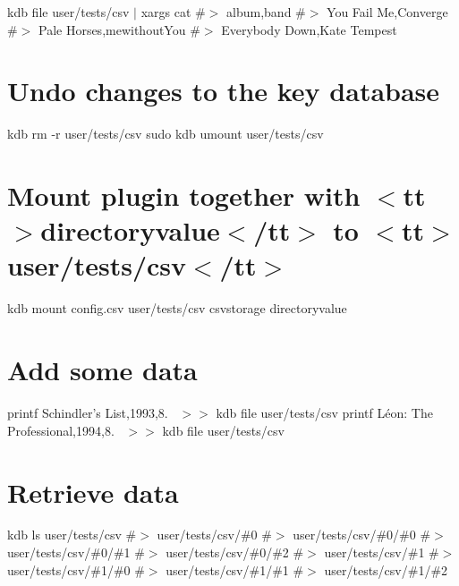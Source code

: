 kdb file user/tests/csv $\vert$ xargs cat \#$>$ album,band \#$>$ You Fail Me,Converge \#$>$ Pale Horses,mewithout\+You \#$>$ Everybody Down,Kate Tempest\hypertarget{autotoc_md126_autotoc_md141}{}\section{Undo changes to the key database}\label{autotoc_md126_autotoc_md141}
kdb rm -\/r user/tests/csv sudo kdb umount user/tests/csv 
\begin{DoxyCode}{0}
\DoxyCodeLine{}
\end{DoxyCode}
 \hypertarget{autotoc_md126_autotoc_md142}{}\section{Mount plugin together with $<$tt$>$directoryvalue$<$/tt$>$ to $<$tt$>$user/tests/csv$<$/tt$>$}\label{autotoc_md126_autotoc_md142}
kdb mount config.\+csv user/tests/csv csvstorage directoryvalue\hypertarget{autotoc_md126_autotoc_md143}{}\section{Add some data}\label{autotoc_md126_autotoc_md143}
printf \textquotesingle{}Schindler’s List,1993,8.~\newline
\textquotesingle{} $>$$>$ {\ttfamily kdb file user/tests/csv} printf \textquotesingle{}Léon\+: The Professional,1994,8.~\newline
\textquotesingle{} $>$$>$ {\ttfamily kdb file user/tests/csv}\hypertarget{autotoc_md126_autotoc_md144}{}\section{Retrieve data}\label{autotoc_md126_autotoc_md144}
kdb ls user/tests/csv \#$>$ user/tests/csv/\#0 \#$>$ user/tests/csv/\#0/\#0 \#$>$ user/tests/csv/\#0/\#1 \#$>$ user/tests/csv/\#0/\#2 \#$>$ user/tests/csv/\#1 \#$>$ user/tests/csv/\#1/\#0 \#$>$ user/tests/csv/\#1/\#1 \#$>$ user/tests/csv/\#1/\#2

